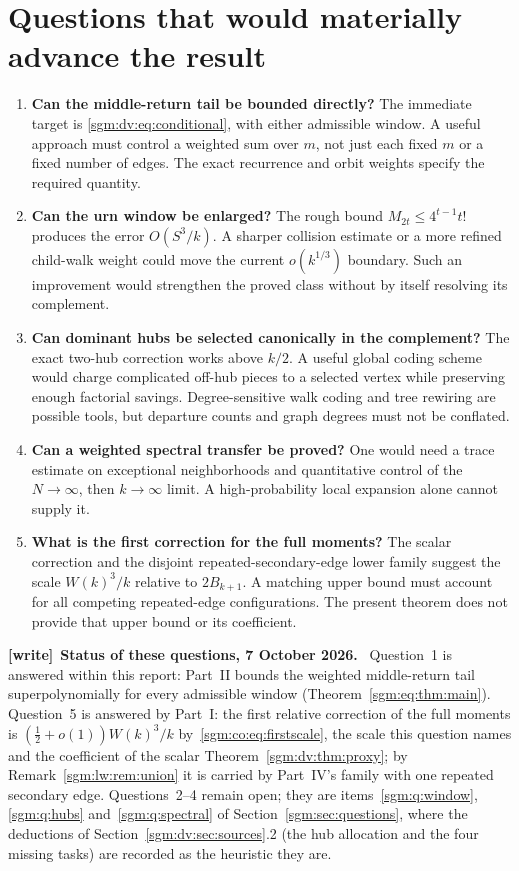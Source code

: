 \documentclass[11pt,letterpaper]{article}
\theoremstyle{remark}\newtheorem{remark}[theorem]{Remark}
\newenvironment{writenote}[1][]{\par\smallskip\begingroup\small
 \noindent\textbf{[write]}\if\relax\detokenize{#1}\relax\else~\textbf{#1.}\fi\ }%
 {\par\endgroup\smallskip}
\theoremstyle{definition}\newtheorem{definition}[theorem]{Definition}
\begin{document}
\section{Questions that would materially advance the result}\label{sgm:dv:sec:questions}
\begin{enumerate}
\item \textbf{Can the middle-return tail be bounded directly?} The immediate target is \eqref{sgm:dv:eq:conditional}, with either admissible window. A useful approach must control a weighted sum over $m$, not just each fixed $m$ or a fixed number of edges. The exact recurrence and orbit weights specify the required quantity.
\item \textbf{Can the urn window be enlarged?} The rough bound $M_{2t}\le4^{t-1}t!$ produces the error $O(S^3/k)$. A sharper collision estimate or a more refined child-walk weight could move the current $o(k^{1/3})$ boundary. Such an improvement would strengthen the proved class without by itself resolving its complement.
\item \textbf{Can dominant hubs be selected canonically in the complement?} The exact two-hub correction works above $k/2$. A useful global coding scheme would charge complicated off-hub pieces to a selected vertex while preserving enough factorial savings. Degree-sensitive walk coding and tree rewiring are possible tools, but departure counts and graph degrees must not be conflated.
\item \textbf{Can a weighted spectral transfer be proved?} One would need a trace estimate on exceptional neighborhoods and quantitative control of the $N\to\infty$, then $k\to\infty$ limit. A high-probability local expansion alone cannot supply it.
\item \textbf{What is the first correction for the full moments?} The scalar correction and the disjoint repeated-secondary-edge lower family suggest the scale $W(k)^3/k$ relative to $2B_{k+1}$. A matching upper bound must account for all competing repeated-edge configurations. The present theorem does not provide that upper bound or its coefficient.
\end{enumerate}
\begin{writenote}[Status of these questions, 7 October 2026]
Question~1 is answered within this report: Part~II bounds the weighted middle-return tail superpolynomially for every admissible window (Theorem~\ref{sgm:eq:thm:main}). Question~5 is answered by Part~I: the first relative correction of the full moments is $(\frac12+o(1))W(k)^3/k$ by~\eqref{sgm:co:eq:firstscale}, the scale this question names and the coefficient of the scalar Theorem~\ref{sgm:dv:thm:proxy}; by Remark~\ref{sgm:lw:rem:union} it is carried by Part~IV's family with one repeated secondary edge. Questions~2--4 remain open; they are items~\ref{sgm:q:window}, \ref{sgm:q:hubs} and~\ref{sgm:q:spectral} of Section~\ref{sgm:sec:questions}, where the deductions of Section~\ref{sgm:dv:sec:sources}.2 (the hub allocation and the four missing tasks) are recorded as the heuristic they are.
\end{writenote}
\end{document}
